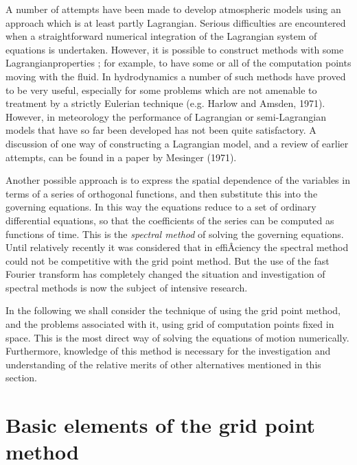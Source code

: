 A number of attempts have been made to develop atmospheric models using
an approach which is at least partly Lagrangian. Serious difficulties
are encountered when a straightforward numerical integration of the
Lagrangian system of equations is undertaken. However, it is possible to
construct methods with some Lagrangianproperties ; for example, to have
some or all of the computation points moving with the fluid. In
hydrodynamics a number of such methods have proved to be very useful,
especially for some problems which are not amenable to treatment by a
strictly Eulerian technique (e.g. Harlow and Amsden, 1971). However, in
meteorology the performance of Lagrangian or semi-Lagrangian models
that have so far been developed has not been quite satisfactory. A
discussion of one way of constructing a Lagrangian model, and a review
of earlier attempts, can be found in a paper by Mesinger (1971).

Another possible approach is to express the spatial dependence of the
variables in terms of a series of orthogonal functions, and then
substitute this into the governing equations. In this way the equations
reduce to a set of ordinary differential equations, so that the
coefficients of the series can be computed as functions of time. This is
the \emph{spectral method} of solving the governing equations. Until
relatively recently it was considered that in effiÂciency the spectral
method could not be competitive with the grid point method. But the use
of the fast Fourier transform has completely changed the situation and
investigation of spectral methods is now the subject of intensive
research.

In the following we shall consider the technique of using the grid point
method, and the problems associated with it, using grid of computation
points fixed in space. This is the most direct way of solving the
equations of motion numerically. Furthermore, knowledge of this method
is necessary for the investigation and understanding of the relative
merits of other alternatives mentioned in this section.

\section{Basic elements of the grid point
method}\label{sec:basic-elements-of-the-grid-point-method}

